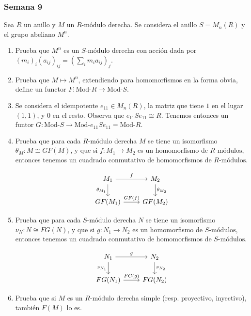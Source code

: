 \documentclass[11pt]{article}
\begin{document}
\subsubsection*{Semana 9}
\label{sec-7-4-8}
\begin{statement}
Sea $R$ un anillo y $M$ un $R\text{-módulo}$ derecha. Se considera el anillo $S=M_n(R)$ y
el grupo abeliano $M^n$.

\begin{enumerate}
\item Prueba que $M^n$ es un $S\text{-módulo}$ derecha con acción dada por
$(m_i)_i(a_{ij})_{ij} = \left( \sum_i m_ia_{ij} \right)_j$.
\item Prueba que $M \mapsto M^n$, extendiendo para homomorfismos en la forma obvia,
define un functor $F \colon \text{Mod-}R \to \text{Mod-}S$.
\item Se considera el idempotente $e_{11} \in M_n(R)$, la matriz que tiene $1$ en el
lugar $(1,1)$, y $0$ en el resto. Observa que $e_{11}Se_{11} \cong R$. Tenemos entonces un
funtor $G \colon \text{Mod-}S \to \text{Mod-}e_{11}Se_{11} = \text{Mod-}R$.
\item Prueba que para cada $R\text{-módulo}$ derecha $M$ se tiene un isomorfismo
$\theta_M\colon M \cong GF(M)$, y que si $f\colon M_1\to M_2$ es un homomorfismo de $R\text{-módulos}$,
entonces tenemos un cuadrado conmutativo de homomorfismos de $R\text{-módulos}$.

\[\begin{tikzcd}
    M_1 \rar{f} \dar[swap]{\theta_{M_1}} & M_2 \dar{\theta_{M_2}} \\
    GF(M_1) \rar{GF(f)} & GF(M_2) 
     \end{tikzcd}\]

\item Prueba que para cada $S\text{-módulo}$ derecha $N$ se tiene un isomorfismo
$\nu_N\colon N \cong FG(N)$, y que si $g\colon N_1 \to N_2$ es un homomorfismo de $S\text{-módulos}$,
entonces tenemos un cuadrado conmutativo de homomorfismos de $S\text{-módulos}$.

\[\begin{tikzcd}
    N_{1} \rar{g} \dar[swap]{\nu_{N_1}} & N_{2} \dar{\nu_{N_2}} \\
    FG(N_{1}) \rar{FG(g)} & FG(N_{2})
    \end{tikzcd}\]

\item Prueba que si $M$ es un $R\text{-módulo}$ derecha simple (resp. proyectivo,
inyectivo), también $F(M)$ lo es.
\end{enumerate}
\end{statement}
\end{document}
